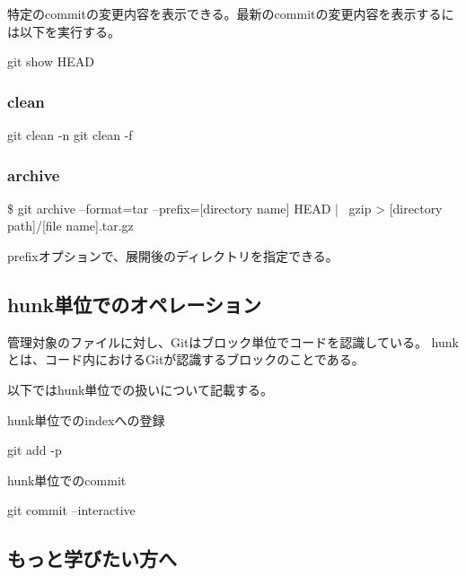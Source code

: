 \documentclass[10pt,a4j,openany,dvipdfmx]{jsarticle}
\begin{document}
特定のcommitの変更内容を表示できる。最新のcommitの変更内容を表示するには以下を実行する。
\begin{commandshell}
git show HEAD
\end{commandshell}

\subsubsection{clean} %
\label{ssub:clean}

\begin{commandshell}
git clean -n
git clean -f 
\end{commandshell}

\subsubsection{archive} %
\label{ssub:archive}

\$ git archive --format=tar --prefix=[directory name] HEAD | \
gzip > [directory path]/[file name].tar.gz

prefixオプションで、展開後のディレクトリを指定できる。

\subsection{hunk単位でのオペレーション} %
\label{sub:hunk単位でのオペレーション}

\begin{tcolorbox}[title=hunkとは, fonttitle=\bfseries]
管理対象のファイルに対し、Gitはブロック単位でコードを認識している。
hunkとは、コード内におけるGitが認識するブロックのことである。
\end{tcolorbox}

以下ではhunk単位での扱いについて記載する。

hunk単位でのindexへの登録
\begin{commandshell}
git add -p
\end{commandshell}

hunk単位でのcommit
\begin{commandshell}
git commit --interactive
\end{commandshell}


\subsection{もっと学びたい方へ} %
\label{sub:もっと学びたい方へ}
\end{document}
